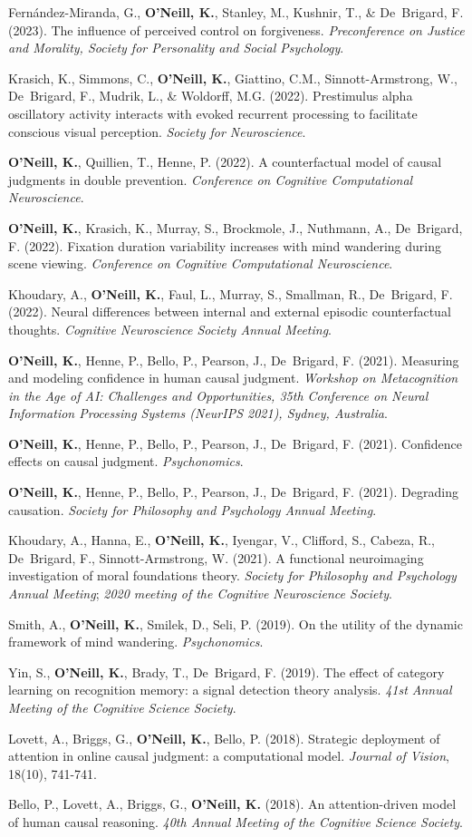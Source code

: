Fern\'{a}ndez-Miranda, G., \textbf{O’Neill, K.}, Stanley, M., Kushnir,
T., \& De~Brigard, F. (2023). The influence of perceived control on
forgiveness. \emph{Preconference on Justice and Morality, Society
for Personality and Social Psychology}.

Krasich, K., Simmons, C., \textbf{O'Neill, K.}, Giattino, C.M.,
Sinnott-Armstrong, W., De~Brigard, F., Mudrik, L., \& Woldorff,
M.G. (2022). Prestimulus alpha oscillatory activity interacts with
evoked recurrent processing to facilitate conscious visual
perception. \emph{Society for Neuroscience}.

\textbf{O'Neill, K.}, Quillien, T., Henne, P. (2022). A
counterfactual model of causal judgments in double
prevention. \emph{Conference on Cognitive Computational
Neuroscience}.

\textbf{O'Neill, K.}, Krasich, K., Murray, S., Brockmole, J.,
Nuthmann, A., De~Brigard, F. (2022). Fixation duration variability
increases with mind wandering during scene viewing. \emph{Conference
on Cognitive Computational Neuroscience}.

Khoudary, A., \textbf{O’Neill, K.}, Faul, L., Murray, S., Smallman,
R., De~Brigard, F. (2022). Neural differences between internal and
external episodic counterfactual thoughts. \emph{Cognitive
Neuroscience Society Annual Meeting}.

\textbf{O'Neill, K.}, Henne, P., Bello, P., Pearson, J., De~Brigard,
F. (2021). Measuring and modeling confidence in human causal
judgment. \emph{Workshop on Metacognition in the Age of AI:
Challenges and Opportunities, 35th Conference on Neural Information
Processing Systems (NeurIPS 2021), Sydney, Australia}.

\textbf{O'Neill, K.}, Henne, P., Bello, P., Pearson, J., De~Brigard,
F. (2021). Confidence effects on causal judgment. \emph{Psychonomics}.

\textbf{O'Neill, K.}, Henne, P., Bello, P., Pearson, J., De~Brigard,
F. (2021). Degrading causation. \emph{Society for Philosophy and
Psychology Annual Meeting}.

Khoudary, A., Hanna, E., \textbf{O’Neill, K.}, Iyengar, V., Clifford,
S., Cabeza, R., De~Brigard, F., Sinnott-Armstrong, W. (2021). A
functional neuroimaging investigation of moral foundations
theory. \emph{Society for Philosophy and Psychology Annual Meeting};
\emph{2020 meeting of the Cognitive Neuroscience Society}.

Smith, A., \textbf{O'Neill, K.}, Smilek, D., Seli, P. (2019). On the
utility of the dynamic framework of mind
wandering. \emph{Psychonomics}.

Yin, S., \textbf{O'Neill, K.}, Brady, T., De~Brigard, F. (2019). The
effect of category learning on recognition memory: a signal detection
theory analysis. \emph{41st Annual Meeting of the Cognitive Science
Society}.

Lovett, A., Briggs, G., \textbf{O'Neill, K.}, Bello,
P. (2018). Strategic deployment of attention in online causal
judgment: a computational model. \emph{Journal of Vision}, 18(10),
741-741.

Bello, P., Lovett, A., Briggs, G., \textbf{O'Neill, K.} (2018). An
attention-driven model of human causal reasoning. \emph{40th Annual
Meeting of the Cognitive Science Society}.
